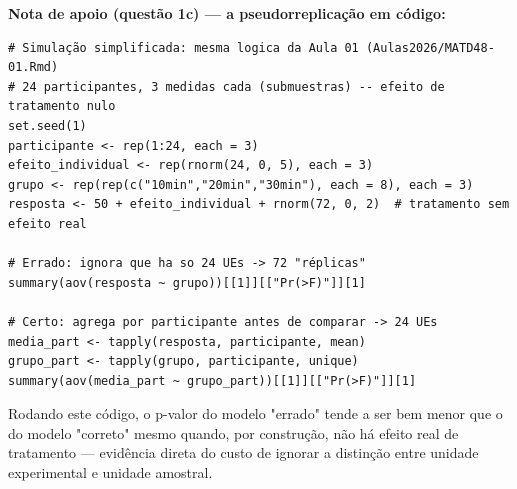 \documentclass[11pt]{article}
\begin{document}
\vspace{1em}
\noindent\textbf{Nota de apoio (questão 1c) — a pseudorreplicação em código:}
\begin{lstlisting}
# Simulação simplificada: mesma logica da Aula 01 (Aulas2026/MATD48-01.Rmd)
# 24 participantes, 3 medidas cada (submuestras) -- efeito de tratamento nulo
set.seed(1)
participante <- rep(1:24, each = 3)
efeito_individual <- rep(rnorm(24, 0, 5), each = 3)
grupo <- rep(rep(c("10min","20min","30min"), each = 8), each = 3)
resposta <- 50 + efeito_individual + rnorm(72, 0, 2)  # tratamento sem efeito real

# Errado: ignora que ha so 24 UEs -> 72 "réplicas"
summary(aov(resposta ~ grupo))[[1]][["Pr(>F)"]][1]

# Certo: agrega por participante antes de comparar -> 24 UEs
media_part <- tapply(resposta, participante, mean)
grupo_part <- tapply(grupo, participante, unique)
summary(aov(media_part ~ grupo_part))[[1]][["Pr(>F)"]][1]
\end{lstlisting}
Rodando este código, o p-valor do modelo "errado" tende a ser bem menor que o do modelo
"correto" mesmo quando, por construção, não há efeito real de tratamento — evidência direta do
custo de ignorar a distinção entre unidade experimental e unidade amostral.
\end{document}
